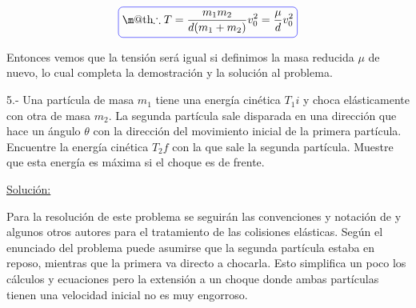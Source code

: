 \documentclass[a4paper,10pt]{article}
\makeatletter
\newcommand*{\boxcolor}{blue}
\renewcommand{\boxed}[1]{\textcolor{\boxcolor}{%
\tikz[baseline={([yshift=-1ex]current bounding box.center)}] \node [rectangle, minimum width=1ex,rounded corners,draw] {\normalcolor\m@th$\displaystyle#1$};}}
\makeatother
\begin{document}
\begin{equation}
 \boxed{\therefore T = \frac{m_1 m_2}{d(m_1 + m_2)}v_0^2 = \frac{\mu}{d} v_0^2} %
\end{equation}

Entonces vemos que la tensión será igual si definimos la masa reducida $\mu$ de nuevo,
lo cual completa la demostración y la solución al problema.





\vspace{.3cm}

5.- Una partícula de masa $m_1$ tiene una energía cinética $T_1i$ y choca elásticamente 
con otra de masa $m_2$. La segunda partícula sale disparada en una dirección que hace un
ángulo $\theta$ con la dirección del movimiento inicial de la primera partícula. Encuentre
la energía cinética $T_2f$ con la que sale la segunda partícula. Muestre que esta energía
es máxima si el choque es de frente.

\vspace{.3cm}

\underline{Solución:}

\vspace{.3cm}



Para la resolución de este problema se seguirán las convenciones y notación de \cite{marion} y algunos
otros autores para el tratamiento de las colisiones elásticas. Según el enunciado del problema puede asumirse 
que la segunda partícula estaba en reposo, mientras que la primera va directo a chocarla. Esto simplifica 
un poco los cálculos y ecuaciones pero la extensión a un choque donde ambas partículas tienen una
velocidad inicial no es muy engorroso.
\end{document}

